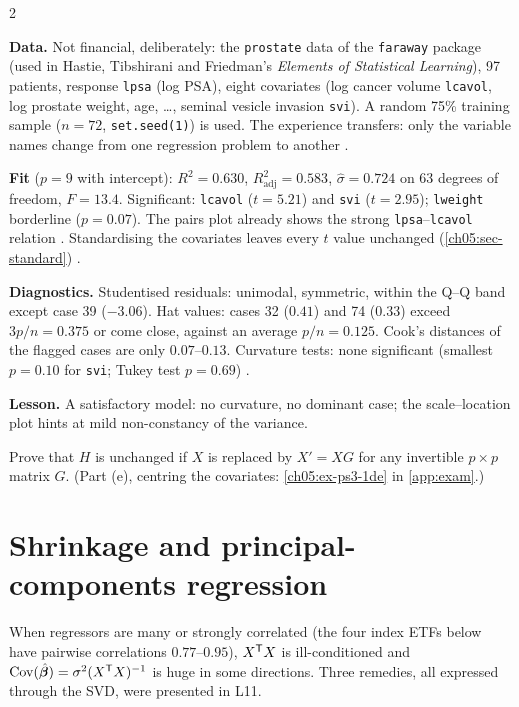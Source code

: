 \begin{paracol}{2}
\begin{casestudy}
\textbf{Data.} Not financial, deliberately: the \texttt{prostate} data of the \texttt{faraway} package (used in Hastie,
Tibshirani and Friedman's \emph{Elements of Statistical Learning}), 97 patients, response \texttt{lpsa} (log PSA), eight
covariates (log cancer volume \texttt{lcavol}, log prostate weight, age, \dots, seminal vesicle invasion \texttt{svi}).
A random 75\% training sample ($n=72$, \texttt{set.seed(1)}) is used. The experience transfers: only the variable
names change from one regression problem to another .

\textbf{Fit} ($p=9$ with intercept): $R^2=0.630$, $R^2_{\text{adj}}=0.583$, $\hat\sigma=0.724$ on 63 degrees of freedom,
$F=13.4$. Significant: \texttt{lcavol} ($t=5.21$) and \texttt{svi} ($t=2.95$); \texttt{lweight} borderline ($p=0.07$). The pairs
plot already shows the strong \texttt{lpsa}--\texttt{lcavol} relation . Standardising the covariates
leaves every $t$ value unchanged (\cref{ch05:sec-standard}) .

\textbf{Diagnostics.} Studentised residuals: unimodal, symmetric, within the Q--Q band except case 39 ($-3.06$). Hat
values: cases 32 ($0.41$) and 74 ($0.33$) exceed $3p/n=0.375$ or come close, against an average $p/n=0.125$. Cook's
distances of the flagged cases are only $0.07$--$0.13$. Curvature tests: none significant (smallest $p=0.10$ for
\texttt{svi}; Tukey test $p=0.69$) .

\textbf{Lesson.} A satisfactory model: no curvature, no dominant case; the scale--location plot hints at mild
non-constancy of the variance.
\end{casestudy}

\begin{exercise}\label{ch05:ex-ps3-1de-short}
Prove that $H$ is unchanged if $X$ is replaced by $X'=XG$ for any invertible $p\times p$ matrix $G$. (Part (e), centring the covariates: \cref{ch05:ex-ps3-1de} in \cref{app:exam}.)
\end{exercise}

\section{Shrinkage and principal-components regression}\label{ch05:sec-shrink}
When regressors are many or strongly correlated (the four index ETFs below have pairwise correlations
$0.77$--$0.95$), $X^{\mathsf T} X$ is ill-conditioned and $\operatorname{Cov}(\hat{\bm\beta})=\sigma^2(X^{\mathsf T} X)^{-1}$ is huge in some directions. Three
remedies, all expressed through the SVD, were presented in L11.


\end{paracol}
